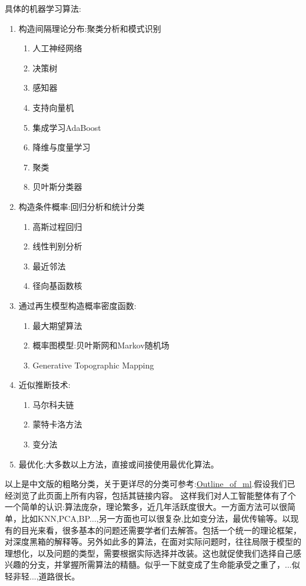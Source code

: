具体的机器学习算法:
\begin{enumerate}
    \item 构造间隔理论分布:聚类分析和模式识别
    \begin{enumerate}
        \item 人工神经网络
        \item 决策树
        \item 感知器
        \item 支持向量机
        \item 集成学习AdaBoost
        \item 降维与度量学习
        \item 聚类
        \item 贝叶斯分类器
    \end{enumerate}
    \item 构造条件概率:回归分析和统计分类
    \begin{enumerate}
        \item 高斯过程回归
        \item 线性判别分析
        \item 最近邻法
        \item 径向基函数核
    \end{enumerate}
    \item 通过再生模型构造概率密度函数:
    \begin{enumerate}
        \item 最大期望算法
        \item 概率图模型:贝叶斯网和Markov随机场
        \item Generative Topographic Mapping
    \end{enumerate}
    \item 近似推断技术:
    \begin{enumerate}
        \item 马尔科夫链
        \item 蒙特卡洛方法
        \item 变分法
    \end{enumerate}
    \item 最优化:大多数以上方法，直接或间接使用最优化算法。
    
\end{enumerate}

以上是中文版的粗略分类，关于更详尽的分类可参考:\href{https://en.wikipedia.org/wiki/Outline_of_machine_learning}{Outline\_of\_ml}.假设我们已经浏览了此页面上所有内容，包括其链接内容。
这样我们对人工智能整体有了个一个简单的认识:算法庞杂，理论繁多，近几年活跃度很大。一方面方法可以很简单，比如KNN,PCA,BP...,另一方面也可以很复杂,比如变分法，最优传输等。以现有的目光来看，很多基本的问题还需要学者们去解答。包括一个统一的理论框架，对深度黑箱的解释等。另外如此多的算法，在面对实际问题时，往往局限于模型的理想化，以及问题的类型，需要根据实际选择并改装。这也就促使我们选择自己感兴趣的分支，并掌握所需算法的精髓。似乎一下就变成了生命能承受之重了，...似轻非轻...,道路很长。

